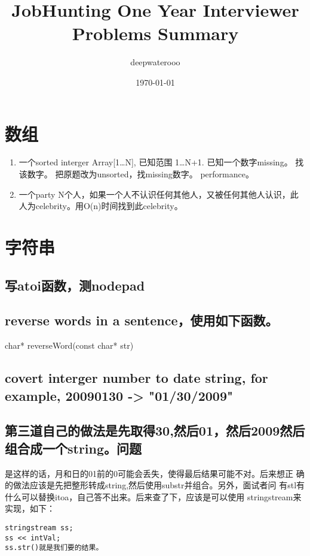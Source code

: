 \documentclass[12pt]{book}
\author{deepwaterooo}
\date{\today}
\title{JobHunting One Year Interviewer Problems Summary}
\begin{document}
\maketitle
\tableofcontents


\chapter{数组}
\label{sec-1}
\begin{enumerate}
\item 一个sorted interger Array[1\ldots{}N], 已知范围 1\ldots{}N+1. 已知一个数字missing。 找该数字。 把原题改为unsorted，找missing数字。 performance。

\item 一个party N个人，如果一个人不认识任何其他人，又被任何其他人认识，此人为celebrity。用O(n)时间找到此celebrity。
\end{enumerate}

\chapter{字符串}
\label{sec-2}
\section{写atoi函数，测nodepad}
\label{sec-2-1}

\section{reverse words in a sentence，使用如下函数。}
\label{sec-2-2}
char* reverseWord(const char* str)

\section{covert interger number to date string, for example, 20090130 -> "01/30/2009"}
\label{sec-2-3}

\section{第三道自己的做法是先取得30,然后01，然后2009然后组合成一个string。问题}
\label{sec-2-4}
是这样的话，月和日的01前的0可能会丢失，使得最后结果可能不对。后来想正
确的做法应该是先把整形转成string,然后使用substr并组合。另外，面试者问
有stl有什么可以替换itoa，自己答不出来。后来查了下，应该是可以使用
stringstream来实现，如下：
\lstset{language=java,label= ,caption= ,numbers=none}
\begin{lstlisting}
stringstream ss;
ss << intVal;
ss.str()就是我们要的结果。
\end{lstlisting}
\end{document}

